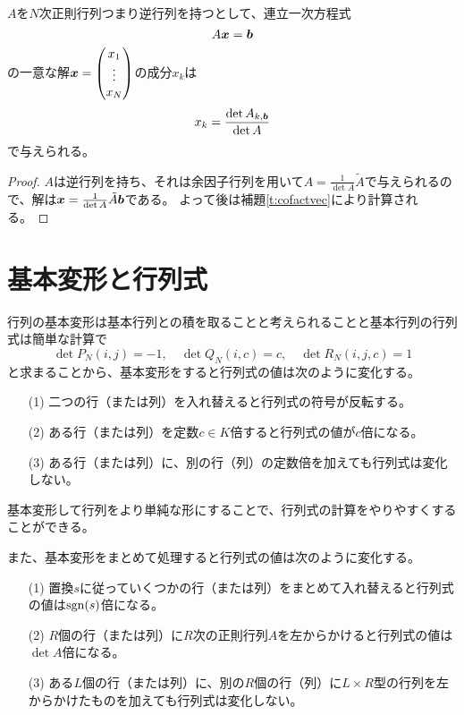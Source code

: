 \begin{theorem}[クラメルの公式]
$A$を$N$次正則行列つまり逆行列を持つとして、連立一次方程式
$$
A\vb*{x} = \vb*{b}
$$
の一意な解$\vb*{x} = \begin{pmatrix}x_1 \\ \vdots \\ x_N\end{pmatrix}$の成分$x_k$は
$$
x_k = \frac{\det A_{k, \vb*{b}}}{\det A}
$$
で与えられる。
\end{theorem}

\begin{proof}
$A$は逆行列を持ち、それは余因子行列を用いて$A = \frac{1}{\det A}\tilde{A}$で与えられるので、解は$\vb*{x} = \frac{1}{\det A}\tilde{A}\vb*{b}$である。
よって後は補題\ref{t:cofactvec}により計算される。
\end{proof}

\section{基本変形と行列式}

行列の基本変形は基本行列との積を取ることと考えられることと基本行列の行列式は簡単な計算で
$$
\det P_N(i, j) = -1,
\quad \det Q_N(i, c) = c,
\quad \det R_N(i, j, c) = 1
$$
と求まることから、基本変形をすると行列式の値は次のように変化する。
\begin{itemize}
\item[(1)]
二つの行（または列）を入れ替えると行列式の符号が反転する。
\item[(2)]
ある行（または列）を定数$c \in K$倍すると行列式の値が$c$倍になる。
\item[(3)]
ある行（または列）に、別の行（列）の定数倍を加えても行列式は変化しない。
\end{itemize}

基本変形して行列をより単純な形にすることで、行列式の計算をやりやすくすることができる。

\begin{example}
\end{example}

また、基本変形をまとめて処理すると行列式の値は次のように変化する。
\begin{itemize}
\item[(1)]
置換$s$に従っていくつかの行（または列）をまとめて入れ替えると行列式の値は$\operatorname{sgn}(s)$倍になる。
\item[(2)]
$R$個の行（または列）に$R$次の正則行列$A$を左からかけると行列式の値は$\det A$倍になる。
\item[(3)]
ある$L$個の行（または列）に、別の$R$個の行（列）に$L\times R$型の行列を左からかけたものを加えても行列式は変化しない。
\end{itemize}

